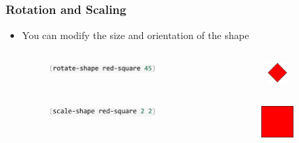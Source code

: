 \documentclass{beamer}
\begin{document}
\begin{frame}[fragile]
\frametitle{Rotation and Scaling}
	\begin{itemize}
	\item You can modify the size and orientation of the shape
	\begin{columns}[t]
		\begin{column}{.45\textwidth}
			\begin{figure}[h]
			\includegraphics[width=4cm]{PresentationImages/rotateRedCode.png}
			\end{figure}
		\end{column}
		\begin{column}{.3\textwidth}
			\begin{figure}[h]
			\includegraphics[width=0.8cm]{PresentationImages/red-rectangle-rotate.png}
			\end{figure}		
		\end{column}
		\end{columns}
		
		\begin{columns}[t]
		\begin{column}{.45\textwidth}
			\begin{figure}[h]
			\includegraphics[width=4cm]{PresentationImages/scaleRedCode.png}
			\end{figure}
		\end{column}
		\begin{column}{.3\textwidth}
			\begin{figure}[h]
			\includegraphics[width=1.2cm]{PresentationImages/red-rectangle-scale.png}
			\end{figure}		
		\end{column}
		\end{columns}
		

\end{itemize}
\end{frame}
\end{document}
